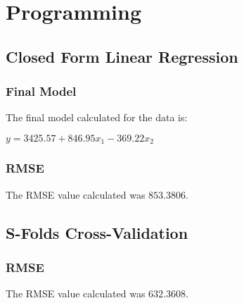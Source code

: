 \documentclass[12pt]{article}
\begin{document}
\section{Programming}
\subsection{Closed Form Linear Regression}
\subsubsection{Final Model}
\noindent
The final model calculated for the data is:

\begin{center}
    $
    y = 3425.57 + 846.95 x_{1} - 369.22 x_{2}
    $
\end{center}

\subsubsection{RMSE}
\noindent
The RMSE value calculated was $853.3806$.

\newpage
\subsection{S-Folds Cross-Validation}
\subsubsection{RMSE}
\noindent
The RMSE value calculated was $632.3608$.
\end{document}
